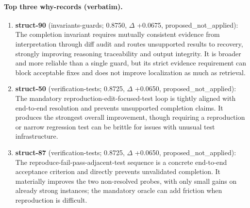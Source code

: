 \paragraph{Top three why-records (verbatim).}\begin{enumerate}\itemsep1pt
\item \textbf{struct-90} (invariants-guards; 0.8750, $\Delta$ +0.0675, proposed\_not\_applied): The completion invariant requires mutually consistent evidence from interpretation through diff audit and routes unsupported results to recovery, strongly improving reasoning traceability and output integrity. It is broader and more reliable than a single guard, but its strict evidence requirement can block acceptable fixes and does not improve localization as much as retrieval.
\item \textbf{struct-50} (verification-tests; 0.8725, $\Delta$ +0.0650, proposed\_not\_applied): The mandatory reproduction-edit-focused-test loop is tightly aligned with end-to-end resolution and prevents unsupported completion claims. It produces the strongest overall improvement, though requiring a reproduction or narrow regression test can be brittle for issues with unusual test infrastructure.
\item \textbf{struct-87} (verification-tests; 0.8725, $\Delta$ +0.0650, proposed\_not\_applied): The reproduce-fail-pass-adjacent-test sequence is a concrete end-to-end acceptance criterion and directly prevents unvalidated completion. It materially improves the two non-resolved probes, with only small gains on already strong instances; the mandatory oracle can add friction when reproduction is difficult.
\end{enumerate}

